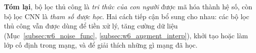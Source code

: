 \textbf{Tóm lại}, bộ lọc thủ công là \emph{tri thức của con người} được mã hóa thành hệ số, còn bộ lọc CNN là \emph{tham số được học}. Hai cách tiếp cận bổ sung cho nhau: các bộ lọc thủ công vẫn được dùng để tiền xử lý, tăng cường dữ liệu (Mục~\ref{subsec:w6_noise_func}, \ref{subsec:w6_augment_interp}), khởi tạo hoặc làm lớp cố định trong mạng, và để giải thích những gì mạng đã học.
